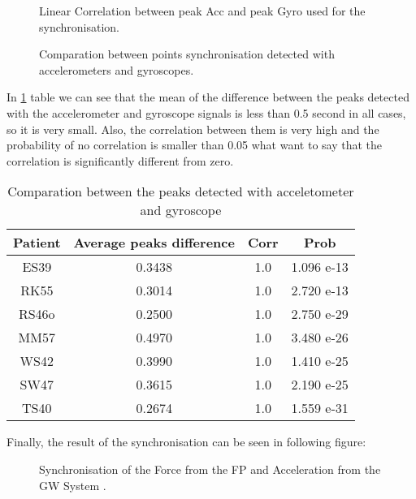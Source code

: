 \begin{figure}[H]
	\centering
	\caption{Linear Correlation between peak Acc and peak Gyro used for the synchronisation.}
	\label{fig:corrAccGyroPoints}
\end{figure}

\begin{figure}[H]
	\centering
	\caption{Comparation between points synchronisation detected with accelerometers and gyroscopes.}
	\label{fig:barDiagram}
\end{figure}


In \ref{tab:comparationAccGyro} table we can see that the mean of the difference between the peaks detected with the accelerometer and gyroscope signals is less than 0.5 second in all cases, so it is very small. Also, the correlation between them is very high and the probability of no correlation is smaller than 0.05 what want to say that the correlation is significantly different from zero.

\begin{table}[h]
	\caption{Comparation between the peaks detected with acceletometer and gyroscope}	
	\centering
	\begin{tabular}{|c|c|c|c|}\hline
		
		Patient 				& Average peaks difference 	& Corr 	& Prob 	\\ \hline
		ES39 & 0.3438			& 1.0									& 1.096 e-13					\\
		RK55	& 0.3014			& 1.0									& 2.720 e-13				\\
		RS46o & 0.2500			& 1.0									& 2.750  e-29					\\
		MM57	& 0.4970			& 1.0									& 3.480 e-26					\\
		WS42  & 0.3990			& 1.0									& 1.410 e-25					\\
		SW47	& 0.3615			& 1.0									& 2.190 e-25					\\
		TS40  & 0.2674			& 1.0									& 1.559 e-31				\\ \hline
	\end{tabular}
	\label{tab:comparationAccGyro}
	
\end{table}

Finally, the result of the synchronisation can be seen in following figure:

\begin{figure}[H]
	\centering
	\caption{Synchronisation of the Force from the FP and Acceleration from the GW System .}
	\label{fig:sinchronisedSignals}
\end{figure}


